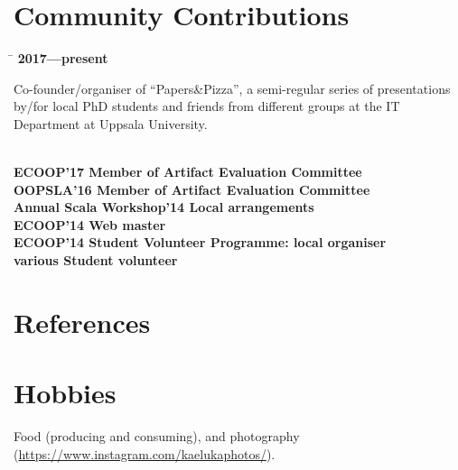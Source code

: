 \documentclass[10pt]{article} %
\begin{document}
\section{Community Contributions}
\begin{tabbing}
  \hspace{4cm}\=\kill
  \bf{2017---present}           \> \parbox{7cm}{Co-founder/organiser of ``Papers\&Pizza'', a
                                   semi-regular series of presentations by/for
                                   local PhD students and friends from different groups at
                                   the IT Department at Uppsala University.}\\[2mm]
  \bf{ECOOP'17}                 \> Member of Artifact Evaluation Committee\\[2mm]
  \bf{OOPSLA'16}                \> Member of Artifact Evaluation Committee\\[2mm]
  \bf{Annual Scala Workshop'14} \> Local arrangements\\[2mm]
  \bf{ECOOP'14}                 \> Web master\\[2mm]
  \bf{ECOOP'14}                 \> Student Volunteer Programme: local organiser\\[2mm]
  \bf{various}                  \> Student volunteer
\end{tabbing}


\section{References}


\section{Hobbies}
Food (producing and consuming), and photography
(\url{https://www.instagram.com/kaelukaphotos/}).
\end{document}

